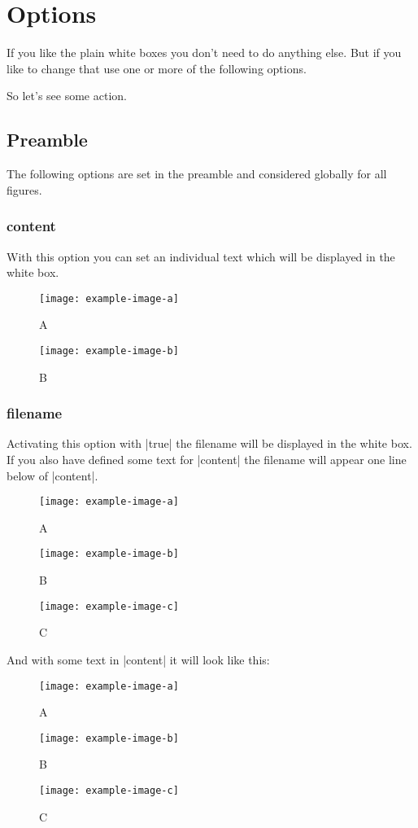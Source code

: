 \documentclass[a4paper,
12pt,
english
]{ltxdoc}
\begin{document}
\section{Options}
If you like the plain white boxes you don’t need to do anything else. But if you like to change that use one or more of the following options.

So let’s see some action.
\subsection{Preamble}
The following options are set in the preamble and considered globally for all figures.
\subsubsection{content}
With this option you can set an individual text which will be displayed in the white box.
\begin{code}
\usepackage[%
  content = {This figure is omitted due to missing copyrights.},%
  ]{draftfigure}
\end{code}
\begin{examplebox}
\begin{figure}[H]
  \centering
  \texttt{[image: example-image-a]}
  \caption{A}
  \texttt{[image: example-image-b]}
  \caption{B}
\end{figure}
\end{examplebox}
\clearpage
\subsubsection{filename}
Activating this option with |true| the filename will be displayed in the white box.
If you also have defined some text for |content| the filename will appear one line below of |content|.
\begin{code}
\usepackage[%
  filename,%
  ]{draftfigure}
\end{code}
\begin{examplebox}
\begin{figure}[H]
  \centering
  \texttt{[image: example-image-a]}
  \caption{A}
  \texttt{[image: example-image-b]}
  \caption{B}
  \texttt{[image: example-image-c]}
  \caption{C}
\end{figure}
\end{examplebox}
\clearpage
And with some text in |content| it will look like this:
\begin{code}
\usepackage[%
  filename,%
  content={no image available}
  ]{draftfigure}
\end{code}
\begin{examplebox}
\begin{figure}[H]
  \centering
  \texttt{[image: example-image-a]}
  \caption{A}
  \texttt{[image: example-image-b]}
  \caption{B}
  \texttt{[image: example-image-c]}
  \caption{C}
\end{figure}
\end{examplebox}
\clearpage
\end{document}
